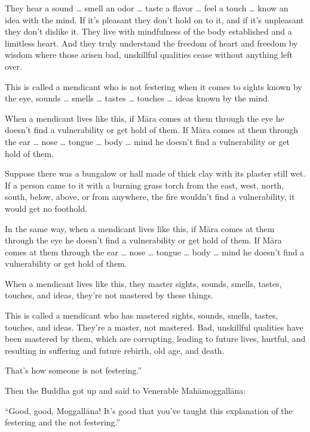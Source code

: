 \documentclass[12pt,openany]{book}%
\begin{document}
They hear a sound … smell an odor … taste a flavor … feel a touch … know an idea with the mind. If it’s pleasant they don’t hold on to it, and if it’s unpleasant they don’t dislike it. They live with mindfulness of the body established and a limitless heart. And they truly understand the freedom of heart and freedom by wisdom where those arisen bad, unskillful qualities cease without anything left over. 

This is called a mendicant who is not festering when it comes to sights known by the eye, sounds … smells … tastes … touches … ideas known by the mind. 

When a mendicant lives like this, if \textsanskrit{Māra} comes at them through the eye he doesn’t find a vulnerability or get hold of them. If \textsanskrit{Māra} comes at them through the ear … nose … tongue … body … mind he doesn’t find a vulnerability or get hold of them. 

Suppose there was a bungalow or hall made of thick clay with its plaster still wet. If a person came to it with a burning grass torch from the east, west, north, south, below, above, or from anywhere, the fire wouldn’t find a vulnerability, it would get no foothold. 

In the same way, when a mendicant lives like this, if \textsanskrit{Māra} comes at them through the eye he doesn’t find a vulnerability or get hold of them. If \textsanskrit{Māra} comes at them through the ear … nose … tongue … body … mind he doesn’t find a vulnerability or get hold of them. 

When a mendicant lives like this, they master sights, sounds, smells, tastes, touches, and ideas, they’re not mastered by these things. 

This is called a mendicant who has mastered sights, sounds, smells, tastes, touches, and ideas. They’re a master, not mastered. Bad, unskillful qualities have been mastered by them, which are corrupting, leading to future lives, hurtful, and resulting in suffering and future rebirth, old age, and death. 

That’s how someone is not festering.” 

Then the Buddha got up and said to Venerable \textsanskrit{Mahāmoggallāna}: 

“Good, good, \textsanskrit{Moggallāna}! It’s good that you’ve taught this explanation of the festering and the not festering.” 
\end{document}
